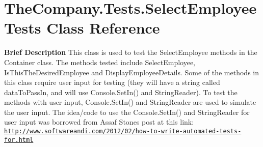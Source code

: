 \hypertarget{class_the_company_1_1_tests_1_1_select_employee_tests}{}\section{The\+Company.\+Tests.\+Select\+Employee\+Tests Class Reference}
\label{class_the_company_1_1_tests_1_1_select_employee_tests}


{\bfseries  Brief Description} This class is used to test the Select\+Employee methods in the Container class. The methods tested include Select\+Employee, Is\+This\+The\+Desired\+Employee and Display\+Employee\+Details. Some of the methods in this class require user input for testing (they will have a string called data\+To\+Pass\+In, and will use Console.\+Set\+In() and String\+Reader). To test the methods with user input, Console.\+Set\+In() and String\+Reader are used to simulate the user input. The idea/code to use the Console.\+Set\+In() and String\+Reader for user input was borrowed from Assaf Stone\textquotesingle{}s post at this link\+: \href{http://www.softwareandi.com/2012/02/how-to-write-automated-tests-for.html}{\tt http\+://www.\+softwareandi.\+com/2012/02/how-\/to-\/write-\/automated-\/tests-\/for.\+html}  



